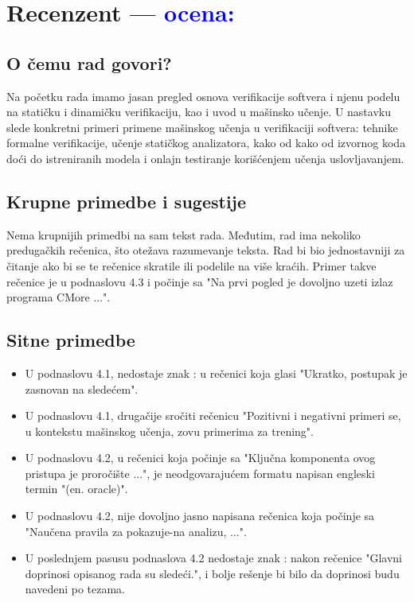 \documentclass[a4paper]{report}
\newcommand{\odgovor}[1]{\textcolor{blue}{#1}}
\begin{document}
\chapter{Recenzent \odgovor{--- ocena:} }


\section{O čemu rad govori?}

Na početku rada imamo jasan pregled osnova verifikacije softvera i njenu podelu na statičku i dinamičku verifikaciju, kao i uvod u mašinsko učenje. U nastavku slede konkretni primeri primene mašinskog učenja u verifikaciji softvera: tehnike formalne verifikacije, učenje statičkog analizatora, kako od kako od izvornog koda doći do istreniranih modela i onlajn testiranje korišćenjem učenja u\-slo\-vlja\-va\-njem.


\section{Krupne primedbe i sugestije}

Nema krupnijih primedbi na sam tekst rada. Međutim, rad ima nekoliko pre\-du\-ga\-čkih rečenica, što otežava razumevanje teksta. Rad bi bio jednostavniji za čitanje ako bi se te rečenice skratile ili podelile na više kraćih. Primer takve rečenice je u podnaslovu 4.3 i počinje sa "Na prvi pogled je dovoljno uzeti izlaz programa CMore ...".

\section{Sitne primedbe}

\begin{itemize}
	\item U podnaslovu 4.1, nedostaje znak : u rečenici koja glasi "Ukratko, postupak je zasnovan na sledećem".
    \item U podnaslovu 4.1, drugačije sročiti rečenicu "Pozitivni i negativni primeri se, u kontekstu mašinskog učenja, zovu primerima za trening".
    \item U podnaslovu 4.2, u rečenici koja počinje sa "Ključna komponenta ovog pristupa je proročište ...", je neodgovarajućem formatu napisan engleski termin "(en. oracle)".
    \item U podnaslovu 4.2, nije dovoljno jasno napisana rečenica koja počinje sa "Naučena pravila za pokazuje-na analizu, ...".
    \item U poslednjem pasusu podnaslova 4.2 nedostaje znak : nakon rečenice "Glavni doprinosi opisanog rada su sledeći.", i bolje rešenje bi bilo da doprinosi budu navedeni po tezama. 
\end{itemize}
\end{document}
